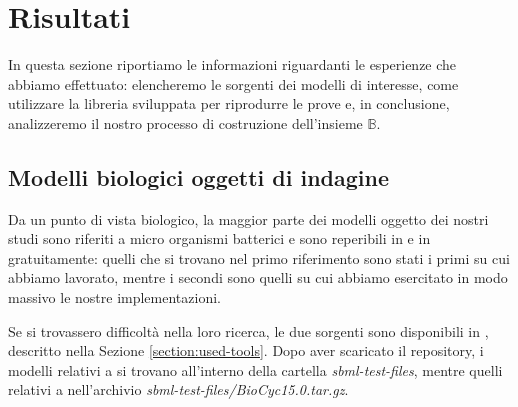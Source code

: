 \section{Risultati}
In questa sezione riportiamo le informazioni riguardanti le esperienze
che abbiamo effettuato: elencheremo le sorgenti dei modelli di
interesse, come utilizzare la libreria sviluppata per riprodurre le
prove e, in conclusione, analizzeremo il nostro processo di
costruzione dell'insieme $\mathbb{B}$.

\subsection{Modelli biologici oggetti di indagine}
Da un punto di vista biologico, la maggior parte dei modelli oggetto
dei nostri studi sono riferiti a micro organismi batterici e sono
reperibili in \cite{SymBioCyc} e in \cite{MetExplore} gratuitamente:
quelli che si trovano nel primo riferimento sono stati i primi su cui
abbiamo lavorato, mentre i secondi sono quelli su cui abbiamo
esercitato in modo massivo le nostre implementazioni.

Se si trovassero difficolt\`a nella loro ricerca, le due sorgenti sono
disponibili in \cite{MyJavaImpl}, descritto nella Sezione
\ref{section:used-tools}. Dopo aver scaricato il repository, i modelli
relativi a \cite{SymBioCyc} si trovano all'interno della cartella
\emph{sbml-test-files}, mentre quelli relativi a \cite{MetExplore}
nell'archivio \emph{sbml-test-files/BioCyc15.0.tar.gz}.


